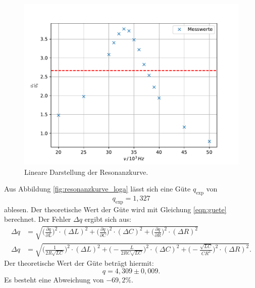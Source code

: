 \begin{figure}[h!]
	\centering
	\includegraphics[width=0.7\linewidth]{FrequenzSpannung_linear.pdf}
	\caption{Lineare Darstellung der Resonanzkurve.}
	\label{fig:resonanzkurve_linear}
\end{figure}

Aus Abbildung \eqref{fig:resonanzkurve_loga} lässt sich eine Güte $q_{\text{exp}}$ von
\begin{equation*}
q_{\text{exp}} = 1{,}327
\end{equation*} 
ablesen. Der theoretische Wert der Güte wird mit Gleichung \eqref{eqn:guete} berechnet. Der Fehler $\Delta q$ ergibt sich aus:
\begin{equation*}
\begin{aligned}
\Delta q &= \sqrt{\biggl(\frac{\partial q}{\partial L}\biggr)^2\cdot (\Delta L)^2 + \biggl(\frac{\partial q}{\partial C}\biggr)^2\cdot (\Delta C)^2 + \biggl(\frac{\partial q}{\partial R}\biggr)^2\cdot (\Delta R)^2} \\
\Delta q &= \sqrt{\biggl(\frac{1}{2R\sqrt{LC}}\biggr)^2\cdot (\Delta L)^2 + \biggl(-\frac{L}{2RC\sqrt{LC}}\biggr)^2\cdot (\Delta C)^2 + \biggl(-\frac{\sqrt{LC}}{CR^2}\biggr)^2\cdot (\Delta R)^2}.
\end{aligned}
\end{equation*}
Der theoretische Wert der Güte beträgt hiermit:
\begin{equation*}
q = 4{,}309 \pm 0{,}009.
\end{equation*}
Es besteht eine Abweichung von $-69{,}2\%$.

